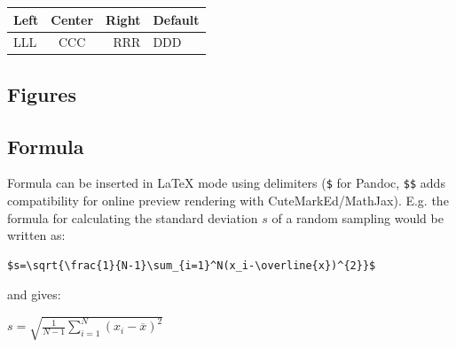 \documentclass[10pt,fleq]{wlpeerj}
\begin{document}
\begin{longtable}[]{@{}lcrl@{}}
\toprule
\begin{minipage}[b]{0.17\columnwidth}\raggedright\strut
Left\strut
\end{minipage}
&
\begin{minipage}[b]{0.24\columnwidth}\centering\strut
Center\strut
\end{minipage}
&
\begin{minipage}[b]{0.20\columnwidth}\raggedleft\strut
Right\strut
\end{minipage}
&
\begin{minipage}[b]{0.27\columnwidth}\raggedright\strut
Default\strut
\end{minipage}\tabularnewline
\midrule
\endhead
\begin{minipage}[t]{0.17\columnwidth}\raggedright\strut
LLL\strut
\end{minipage}
&
\begin{minipage}[t]{0.24\columnwidth}\centering\strut
CCC\strut
\end{minipage}
&
\begin{minipage}[t]{0.20\columnwidth}\raggedleft\strut
RRR\strut
\end{minipage}
&
\begin{minipage}[t]{0.27\columnwidth}\raggedright\strut
DDD\strut
\end{minipage}\tabularnewline
\bottomrule
\end{longtable}

\subsection{Figures}\label{figures}

\subsection{Formula}\label{formula}

Formula
can be
inserted
in LaTeX
mode using
delimiters
(\texttt{\$}
for
Pandoc,
\texttt{\$\$}
adds
compatibility
for online
preview
rendering
with
CuteMarkEd/MathJax).
E.g. the
formula
for
calculating
the
standard
deviation
\(s\) of a
random
sampling
would be
written
as:

\begin{verbatim}
$s=\sqrt{\frac{1}{N-1}\sum_{i=1}^N(x_i-\overline{x})^{2}}$
\end{verbatim}

and gives:

\(s=\sqrt{\frac{1}{N-1}\sum_{i=1}^N(x_i-\overline{x})^{2}}\)
\end{document}
